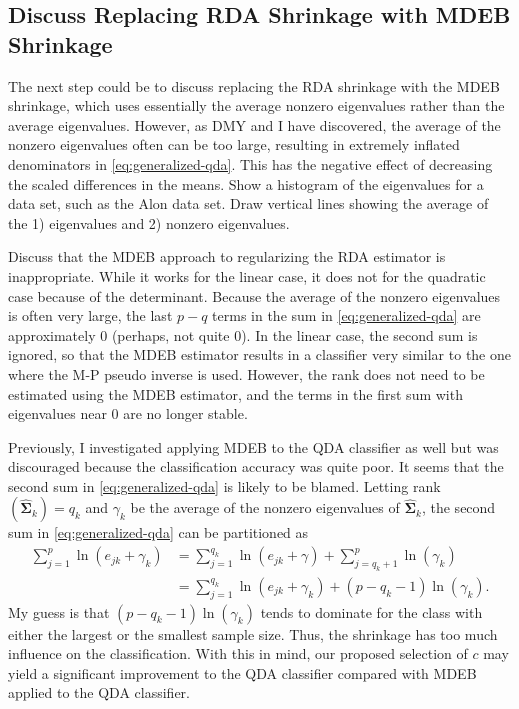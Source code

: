 \documentclass[11pt]{article}
\begin{document}
\subsection{Discuss Replacing RDA Shrinkage with MDEB Shrinkage}

The next step could be to discuss replacing the RDA shrinkage with the MDEB shrinkage, which uses essentially the average nonzero eigenvalues rather than the average eigenvalues. However, as DMY and I have discovered, the average of the nonzero eigenvalues often can be too large, resulting in extremely inflated denominators in \eqref{eq:generalized-qda}. This has the negative effect of decreasing the scaled differences in the means. Show a histogram of the eigenvalues for a data set, such as the Alon data set. Draw vertical lines showing the average of the 1) eigenvalues and 2) nonzero eigenvalues.

Discuss that the MDEB approach to regularizing the RDA estimator is inappropriate. While it works for the linear case, it does not for the quadratic case because of the determinant. Because the average of the nonzero eigenvalues is often very large, the last $p - q$ terms in the sum in \eqref{eq:generalized-qda} are approximately 0 (perhaps, not quite 0). In the linear case, the second sum is ignored, so that the MDEB estimator results in a classifier very similar to the one where the M-P pseudo inverse is used. However, the rank does not need to be estimated using the MDEB estimator, and the terms in the first sum with eigenvalues near 0 are no longer stable.

Previously, I investigated applying MDEB to the QDA classifier as well but was discouraged because the classification accuracy was quite poor. It seems that the second sum in \eqref{eq:generalized-qda} is likely to be blamed. Letting rank$(\widehat{\bm\Sigma}_k) = q_k$ and $\gamma_k$ be the average of the nonzero eigenvalues of $\widehat{\bm \Sigma}_k$, the second sum in \eqref{eq:generalized-qda} can be partitioned as
\begin{align*}
	\sum_{j=1}^p \ln (e_{jk} + \gamma_k) &= \sum_{j=1}^{q_k} \ln (e_{jk} + \gamma) + \sum_{j=q_k + 1}^p \ln (\gamma_k)\\
	&= \sum_{j=1}^{q_k} \ln (e_{jk} + \gamma_k) + (p - q_k - 1) \ln (\gamma_k).
\end{align*}
My guess is that $(p - q_k - 1) \ln (\gamma_k)$ tends to dominate for the class with either the largest or the smallest sample size. Thus, the shrinkage has too much influence on the classification. With this in mind, our proposed selection of $c$ may yield a significant improvement to the QDA classifier compared with MDEB applied to the QDA classifier.
\end{document}
